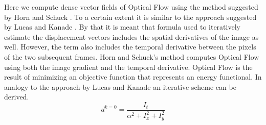 Here we compute dense vector fields of Optical Flow using the method suggested by Horn and Schuck \parencite*{horn1981determining}. To a certain extent it is similar to the approach suggested by Lucas and Kanade \parencite*{ lucas1981iterative}. By that it is meant that formula used to iteratively estimate the displacement vectors includes the spatial derivatives of the image as well.  However, the term also includes the temporal derivative between the pixels of the two subsequent frames. Horn and Schuck’s method computes Optical Flow using both the image gradient and the temporal derivative. Optical Flow is the result of minimizing an objective function that represents an energy functional. In analogy to the approach by Lucas and Kanade \parencite*{ lucas1981iterative} an iterative scheme can be derived. \\
\begin{equation}
  d^{k=0} = \frac{I_t}{\alpha^2+I_x^2+I_y^2}
\label{eqn:d_at_it_zero}
\end{equation}

